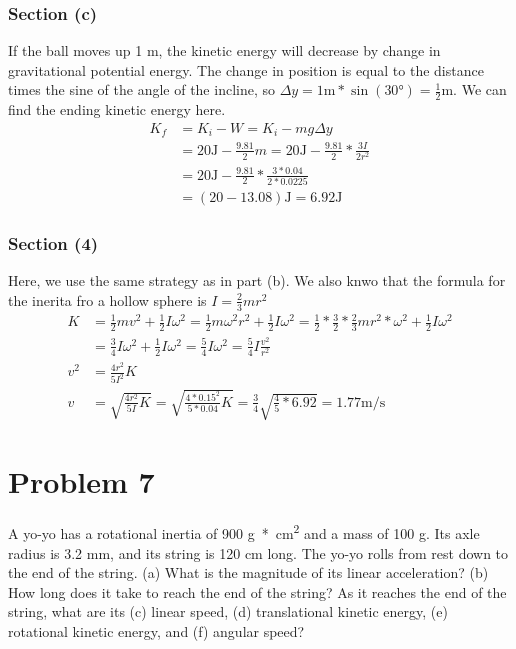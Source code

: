 \documentclass[12pt]{article}
\begin{document}
\subsubsection{Section (c)}
If the ball moves up 1 m, the kinetic energy will decrease by change in gravitational potential energy. The change in position is equal to the distance times the sine of the angle of the incline, so \(\Delta y = 1\unit{\meter} * \sin(30\unit{\degree}) = \frac{1}{2}\unit{\meter}\). We can find the ending kinetic energy here.
\begin{align}
    K_f &=  K_i - W
        =   K_i - mg\Delta y\\
        &=  20\unit{\joule} - \frac{9.81}{2}m
        =   20\unit{\joule} - \frac{9.81}{2}*\frac{3I}{2r^2}\\
        &=  20\unit{\joule} - \frac{9.81}{2}*\frac{3*0.04}{2*0.0225}\\
        &=  (20 - 13.08)\unit{\joule}
        =   \boxed{6.92\unit{\joule}}
\end{align}

\subsubsection{Section (4)}
Here, we use the same strategy as in part (b). We also knwo that the formula for the inerita fro a hollow sphere is \(I = \frac{2}{3}mr^2\) 
\begin{align}
    K   &=  \frac{1}{2}mv^2 + \frac{1}{2}I\omega^2
        =   \frac{1}{2}m\omega^2 r^2 + \frac{1}{2}I\omega^2
        =   \frac{1}{2}*\frac{3}{2}*\frac{2}{3}mr^2*\omega^2 + \frac{1}{2}I\omega^2\\
        &=  \frac{3}{4}I\omega^2 + \frac{1}{2}I\omega^2
        =   \frac{5}{4}I\omega^2
        =   \frac{5}{4}I\frac{v^2}{r^2}\\
    v^2 &=  \frac{4r^2}{5I^2}K\\
    v   &=  \sqrt{\frac{4r^2}{5I}K}
        =   \sqrt{\frac{4*0.15^2}{5*0.04}K}
        =   \frac{3}{4}\sqrt{\frac{4}{5}*6.92}
        =   \boxed{1.77\unit{\meter/\second}}
\end{align}


\pagebreak
\section{Problem 7}
A yo-yo has a rotational inertia of 900 \unit{\gram*\centi\meter^2} and a mass of 100 g. Its axle radius is 3.2 mm, and its string is 120 cm long. The yo-yo rolls from rest down to the end of the string. (a) What is the magnitude of its linear acceleration? (b) How long does it take to reach the end of the string? As it reaches the end of the string, what are its (c) linear speed, (d) translational kinetic energy, (e) rotational kinetic energy, and (f) angular speed?
\end{document}
